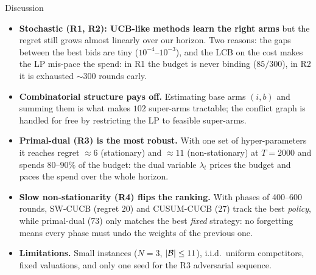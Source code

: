 \documentclass[12pt,aspectratio=169]{beamer}
\begin{document}
\begin{frame}{Discussion}
\scriptsize
\begin{itemize}
  \item \textbf{Stochastic (R1, R2): UCB-like methods learn the right arms} but the regret still grows
        almost linearly over our horizon. Two reasons: the gaps between the best bids are tiny
        ($10^{-4}$--$10^{-3}$), and the LCB on the cost makes the LP mis-pace the spend:
        in R1 the budget is never binding ($85/300$), in R2 it is exhausted $\sim\!300$ rounds early.
  \item \textbf{Combinatorial structure pays off.} Estimating base arms $(i,b)$ and summing them
        is what makes $102$ super-arms tractable; the conflict graph is handled for free by
        restricting the LP to feasible super-arms.
  \item \textbf{Primal-dual (R3) is the most robust.} With one set of hyper-parameters it reaches
        regret $\approx 6$ (stationary) and $\approx 11$ (non-stationary) at $T=2000$ and spends
        $80$--$90\%$ of the budget: the dual variable $\lambda_t$ prices the budget and paces the
        spend over the whole horizon.
  \item \textbf{Slow non-stationarity (R4) flips the ranking.} With phases of 400--600 rounds,
        SW-CUCB (regret $20$) and CUSUM-CUCB ($27$) track the best \emph{policy}, while primal-dual
        ($73$) only matches the best \emph{fixed} strategy: no forgetting means every phase must
        undo the weights of the previous one.
  \item \textbf{Limitations.} Small instances ($N=3$, $|\mathcal{B}|\le 11$), i.i.d.\ uniform competitors,
        fixed valuations, and only one seed for the R3 adversarial sequence.
\end{itemize}
\end{frame}
\end{document}
